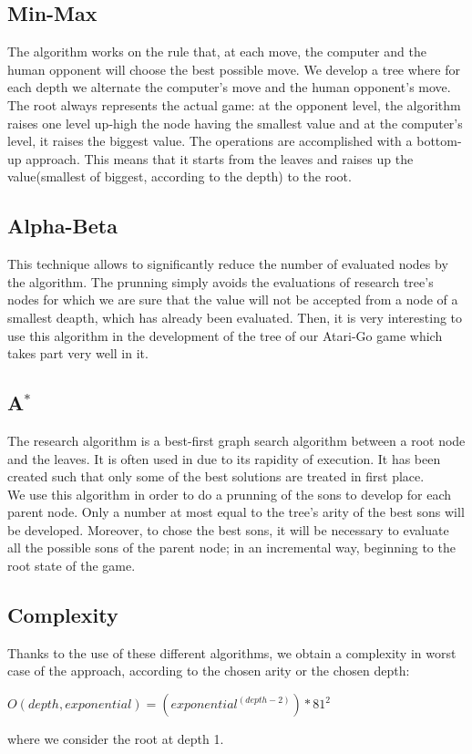\documentclass[a4paper,10pt]{report}
\newcommand{\empha}[1]{\textbf{\color{blue}{#1}}}
\begin{document}
			\subsection{Min-Max}
			The \empha{Min-Max} algorithm works on the rule that, at each move, the computer and the human opponent will choose the best possible move. We develop a tree where for each depth we alternate the computer's move and the human opponent's move.\\
The root always represents the actual game: at the opponent level, the algorithm raises one level up-high the node having the smallest value and at the computer's level, it raises the biggest value. The operations are accomplished with a bottom-up approach. This means that it starts from the leaves and raises up the value(smallest of biggest, according to the depth) to the root.

			\subsection{Alpha-Beta}
			This technique allows to significantly reduce the number of evaluated nodes by the \empha{Min-Max} algorithm. The \empha{Alpha-Beta} prunning simply avoids the evaluations of research tree's nodes for which we are sure that the value will not be accepted from a node of a smallest deapth, which has already been evaluated. Then, it is very interesting to use this algorithm in the development of the tree of our Atari-Go game which takes part very well in it.

			\subsection{A$^*$}
			The research \empha{$A^*$} algorithm is a best-first graph search algorithm between a root node and the leaves. It is often used in \empha{Artificial Inteligence} due to its rapidity of execution. It has been created such that only some of the best solutions are treated in first place.
\\
We use this algorithm in order to do a prunning of the sons to develop for each parent node. Only a number at most equal to the tree's arity of the best sons will be developed. Moreover, to chose the best sons, it will be necessary to evaluate all the possible sons of the parent node; in an incremental way, beginning to the root state of the game.

			\subsection{Complexity}
			Thanks to the use of these different algorithms, we obtain a complexity in worst case of the approach, according to the chosen arity or the chosen depth:
			\begin{center}
				$	O(depth, exponential) = (exponential ^{(depth - 2)} ) * 81^2	$
			\end{center}
			where we consider the root at depth 1.
\end{document}
